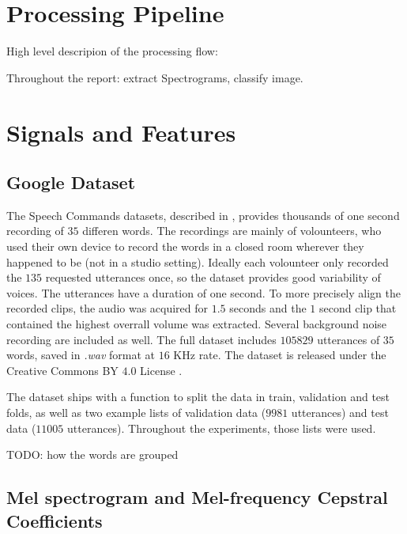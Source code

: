 
\section{Processing Pipeline}
\label{sec:processing_architecture}

High level descripion of the processing flow:

Throughout the report: extract Spectrograms, classify image.

\section{Signals and Features}
\label{sec:model}

\subsection{Google Dataset}


The Speech Commands datasets, described in \cite{warden2018speech}, provides
thousands of one second recording of $35$ differen words. The recordings are
mainly of volounteers, who used their own device to record the words in a
closed room wherever they happened to be (not in a studio setting).
Ideally each volounteer only recorded the $135$ requested utterances once, so the
dataset provides good variability of voices.
The utterances have a duration of one second.
To more precisely align the recorded clips, the audio was acquired for $1.5$
seconds and the $1$ second clip that contained the highest overrall volume was
extracted.
Several background noise recording are included as well.
The full dataset includes $105829$ utterances of $35$ words, saved in
\textit{.wav} format at $16$ KHz rate.
The dataset is released under the Creative Commons BY $4.0$ License \cite{ccby4}.

The dataset ships with a function to split the data in train, validation and
test folds, as well as two example lists of validation data ($9981$ utterances)
and test data ($11005$ utterances).
Throughout the experiments, those lists were used.

TODO: how the words are grouped

\subsection{Mel spectrogram and Mel-frequency Cepstral Coefficients}

